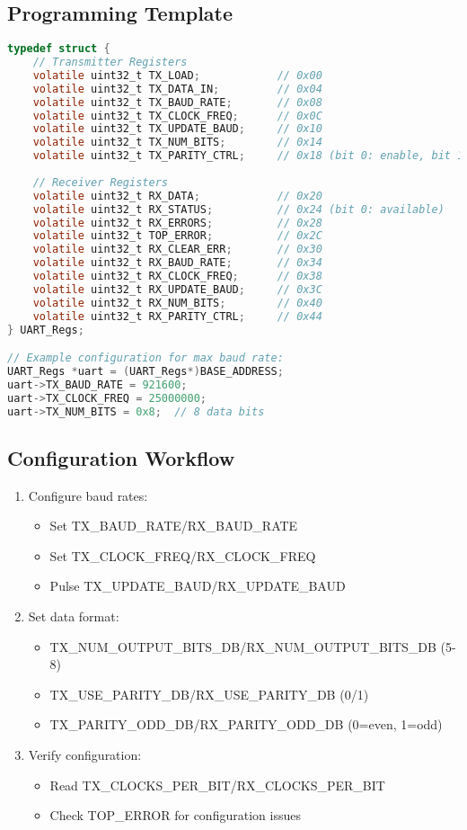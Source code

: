 \subsection{Programming Template}
\begin{lstlisting}[language=C,frame=single]
typedef struct {
    // Transmitter Registers
    volatile uint32_t TX_LOAD;            // 0x00
    volatile uint32_t TX_DATA_IN;         // 0x04
    volatile uint32_t TX_BAUD_RATE;       // 0x08
    volatile uint32_t TX_CLOCK_FREQ;      // 0x0C
    volatile uint32_t TX_UPDATE_BAUD;     // 0x10
    volatile uint32_t TX_NUM_BITS;        // 0x14
    volatile uint32_t TX_PARITY_CTRL;     // 0x18 (bit 0: enable, bit 1: odd)
    
    // Receiver Registers
    volatile uint32_t RX_DATA;            // 0x20
    volatile uint32_t RX_STATUS;          // 0x24 (bit 0: available)
    volatile uint32_t RX_ERRORS;          // 0x28
    volatile uint32_t TOP_ERROR;          // 0x2C
    volatile uint32_t RX_CLEAR_ERR;       // 0x30
    volatile uint32_t RX_BAUD_RATE;       // 0x34
    volatile uint32_t RX_CLOCK_FREQ;      // 0x38
    volatile uint32_t RX_UPDATE_BAUD;     // 0x3C
    volatile uint32_t RX_NUM_BITS;        // 0x40
    volatile uint32_t RX_PARITY_CTRL;     // 0x44
} UART_Regs;

// Example configuration for max baud rate:
UART_Regs *uart = (UART_Regs*)BASE_ADDRESS;
uart->TX_BAUD_RATE = 921600;
uart->TX_CLOCK_FREQ = 25000000;
uart->TX_NUM_BITS = 0x8;  // 8 data bits
\end{lstlisting}

\subsection{Configuration Workflow}
\begin{enumerate}
\item Configure baud rates:
  \begin{itemize}
  \item Set TX\_BAUD\_RATE/RX\_BAUD\_RATE
  \item Set TX\_CLOCK\_FREQ/RX\_CLOCK\_FREQ
  \item Pulse TX\_UPDATE\_BAUD/RX\_UPDATE\_BAUD
  \end{itemize}
  
\item Set data format:
  \begin{itemize}
  \item TX\_NUM\_OUTPUT\_BITS\_DB/RX\_NUM\_OUTPUT\_BITS\_DB (5-8)
  \item TX\_USE\_PARITY\_DB/RX\_USE\_PARITY\_DB (0/1)
  \item TX\_PARITY\_ODD\_DB/RX\_PARITY\_ODD\_DB (0=even, 1=odd)
  \end{itemize}

\item Verify configuration:
  \begin{itemize}
  \item Read TX\_CLOCKS\_PER\_BIT/RX\_CLOCKS\_PER\_BIT
  \item Check TOP\_ERROR for configuration issues
  \end{itemize}
\end{enumerate}

